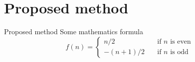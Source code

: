 \section{Proposed method}

\begin{frame}{Proposed method}
    Some mathematics formula
    \begin{equation}
		f(n) =
            \begin{cases}
                n/2       & \quad \text{if } n \text{ is even}\\
                -(n+1)/2  & \quad \text{if } n \text{ is odd}
            \end{cases}
	\end{equation}
\end{frame}